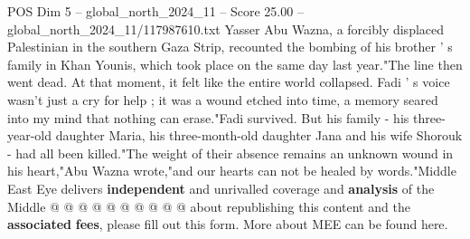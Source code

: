 \begin{textsample}{POS Dim 5 – global\_north\_2024\_11 – Score 25.00 – global\_north\_2024\_11/117987610.txt}
Yasser Abu Wazna, a forcibly displaced Palestinian in the southern Gaza Strip, recounted the bombing of his brother ' s family in Khan Younis, which took place on the same day last year."The line then went dead.
At that moment, it felt like the entire world collapsed.
Fadi ' s voice wasn't just a cry for help ; it was a wound etched into time, a memory seared into my mind that nothing can erase."Fadi survived.
But his family - his three-year-old daughter Maria, his three-month-old daughter Jana and his wife Shorouk - had all been killed."The weight of their absence remains an unknown wound in his heart,"Abu Wazna wrote,"and our hearts can not be healed by words."Middle East Eye delivers \textbf{independent} and unrivalled coverage and \textbf{analysis} of the Middle @ @ @ @ @ @ @ @ @ @ about republishing this content and the \textbf{associated} \textbf{fees}, please fill out this form.
More about MEE can be found here.

\end{textsample}
